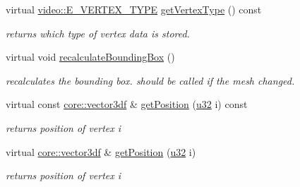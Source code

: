\begin{DoxyCompactItemize}
\mbox{\label{structirr_1_1scene_1_1SSharedMeshBuffer_af6e2e8a103a2c0713d5a090d92a4edb6}} 
virtual \hyperlink{namespaceirr_1_1video_a0e3b59e025e0d0db0ed2ee0ce904deac}{video\+::\+E\+\_\+\+V\+E\+R\+T\+E\+X\+\_\+\+T\+Y\+PE} \hyperlink{structirr_1_1scene_1_1SSharedMeshBuffer_af6e2e8a103a2c0713d5a090d92a4edb6}{get\+Vertex\+Type} () const
\begin{DoxyCompactList}\small\item\em returns which type of vertex data is stored. \end{DoxyCompactList}\item 
\mbox{\label{structirr_1_1scene_1_1SSharedMeshBuffer_a1425de91a910751d0e7fc8b8dca636e9}} 
virtual void \hyperlink{structirr_1_1scene_1_1SSharedMeshBuffer_a1425de91a910751d0e7fc8b8dca636e9}{recalculate\+Bounding\+Box} ()
\begin{DoxyCompactList}\small\item\em recalculates the bounding box. should be called if the mesh changed. \end{DoxyCompactList}\item 
\mbox{\label{structirr_1_1scene_1_1SSharedMeshBuffer_ad0b4d04e67c39d2dab9900bdfce6b474}} 
virtual const \hyperlink{namespaceirr_1_1core_ae6e2b2a6c552833ebbd5b7463d03586b}{core\+::vector3df} \& \hyperlink{structirr_1_1scene_1_1SSharedMeshBuffer_ad0b4d04e67c39d2dab9900bdfce6b474}{get\+Position} (\hyperlink{namespaceirr_a0416a53257075833e7002efd0a18e804}{u32} i) const
\begin{DoxyCompactList}\small\item\em returns position of vertex i \end{DoxyCompactList}\item 
\mbox{\label{structirr_1_1scene_1_1SSharedMeshBuffer_a3a9d00d4a52471083a21ed18a8ce7729}} 
virtual \hyperlink{namespaceirr_1_1core_ae6e2b2a6c552833ebbd5b7463d03586b}{core\+::vector3df} \& \hyperlink{structirr_1_1scene_1_1SSharedMeshBuffer_a3a9d00d4a52471083a21ed18a8ce7729}{get\+Position} (\hyperlink{namespaceirr_a0416a53257075833e7002efd0a18e804}{u32} i)
\begin{DoxyCompactList}\small\item\em returns position of vertex i \end{DoxyCompactList}\item 

\end{DoxyCompactItemize}
